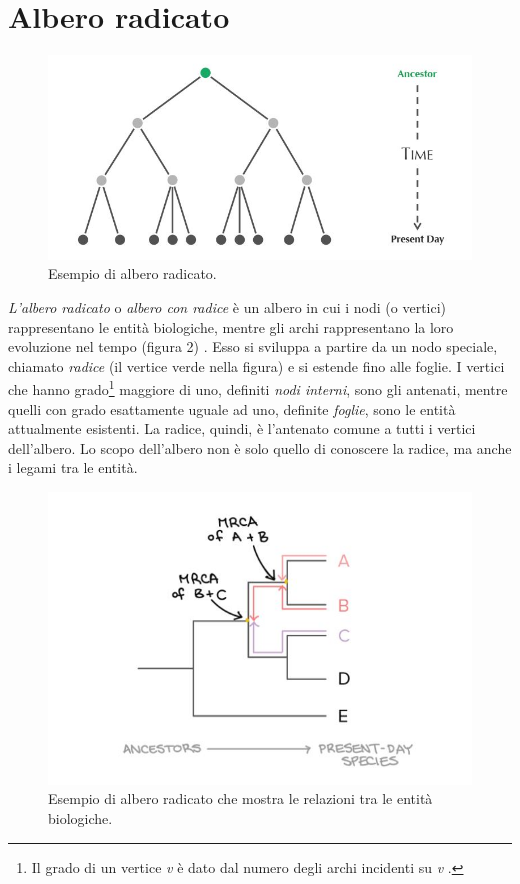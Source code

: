 \section{Albero radicato}
\begin{figure}[ht]
\begin{center}
\includegraphics[scale=0.7]{rooted_tree.jpg}
\end{center}
\caption{Esempio di albero radicato.}
\label{Img:RootedTree}
\end{figure}
\textit{L'albero radicato} o \textit{albero con radice} è un albero in cui i nodi (o vertici) rappresentano le entità biologiche, mentre gli archi rappresentano la loro evoluzione nel tempo (figura 2) \cite{bioinfalganactivelearningapproachparttwo}. Esso si sviluppa a partire da un nodo speciale, chiamato \textit{radice} (il vertice verde nella figura) e si estende fino alle foglie. I vertici che hanno grado\footnote{Il grado di un vertice \textit{v} è dato dal numero degli archi incidenti su \textit{v} \cite{algoritmiEStruttureDati2}.} maggiore di uno, definiti \textit{nodi interni}, sono gli antenati, mentre quelli con grado esattamente uguale ad uno, definite \textit{foglie}, sono le entità attualmente esistenti. La radice, quindi, è l'antenato comune a tutti i vertici dell'albero.
\newline
Lo scopo dell'albero non è solo quello di conoscere la radice, ma anche i legami tra le entità.
\newline
\begin{figure}[h!]
	\includegraphics[width=\linewidth]{rooted_tree_2.jpg}
 	\caption{Esempio di albero radicato che mostra le relazioni tra le entità biologiche.}
  	\label{fig:RootedTree}
\end{figure}
